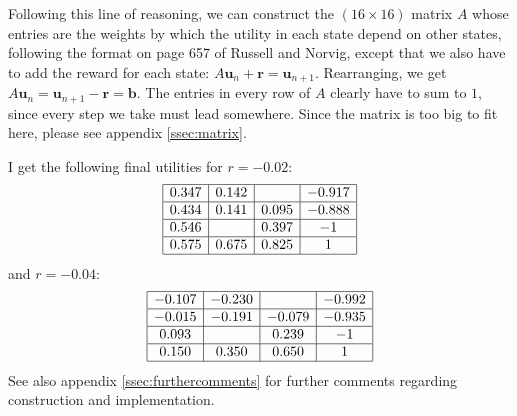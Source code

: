 \documentclass[letterpaper, 10pt]{article}
\begin{document}
\begin{multicols*}{2}
Following this line of reasoning, we can construct the $(16 \times 16)$ matrix $A$ whose entries are the weights by which the utility in each state depend on other states, following the format on page 657 of Russell and Norvig, except that we also have to add the reward for each state:
$A \mathbf{u}_n + \mathbf{r} = \mathbf{u}_{n+1}$.
Rearranging, we get $A \mathbf{u}_n = \mathbf{u}_{n+1} - \mathbf{r} = \mathbf{b}$.
The entries in every row of $A$ clearly have to sum to $1$, since every step we take must lead somewhere. 
Since the matrix is too big to fit here, please see appendix \ref{ssec:matrix}. 

I get the following final utilities for $r = -0.02$:
\[
\begin{array}{|c|c|c|c|}
	\hline
	0.347 &  0.142 &        & -0.917 \\
	\hline
	0.434 &  0.141 &  0.095 & -0.888 \\
	\hline
	0.546 &        &  0.397 & -1     \\
	\hline
	0.575 &  0.675 &  0.825 &  1 \\
	\hline
\end{array}
\]
and $r = -0.04$:
\[
\begin{array}{|c|c|c|c|}
	\hline
	-0.107 & -0.230 &        & -0.992 \\
	\hline
	-0.015 & -0.191 & -0.079 & -0.935 \\
	\hline
	 0.093 &        &  0.239 & -1     \\
	 \hline
	 0.150 &  0.350 &  0.650 &  1     \\
	 \hline
\end{array}
\]
See also appendix \ref{ssec:furthercomments} for further comments regarding construction and implementation.


\end{multicols*}
\end{document}
